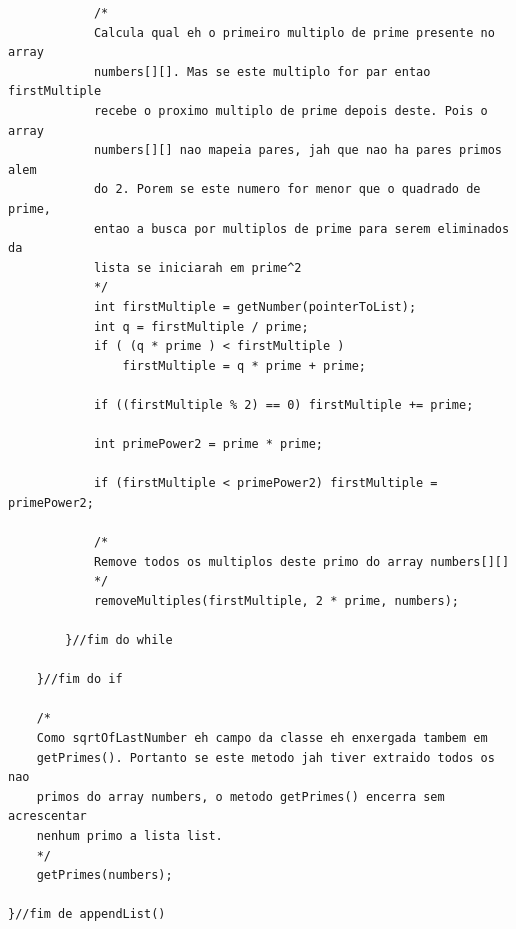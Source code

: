 \documentclass[a4paper,12pt,openany]{book}
\begin{document}
\begin{lstlisting}
			/*
			Calcula qual eh o primeiro multiplo de prime presente no array
			numbers[][]. Mas se este multiplo for par entao firstMultiple
			recebe o proximo multiplo de prime depois deste. Pois o array
			numbers[][] nao mapeia pares, jah que nao ha pares primos alem 
			do 2. Porem se este numero for menor que o quadrado de prime,
			entao a busca por multiplos de prime para serem eliminados da 
			lista se iniciarah em prime^2
			*/
			int firstMultiple = getNumber(pointerToList);
			int q = firstMultiple / prime;
			if ( (q * prime ) < firstMultiple )
				firstMultiple = q * prime + prime;
			
			if ((firstMultiple % 2) == 0) firstMultiple += prime;
			
			int primePower2 = prime * prime;
			
			if (firstMultiple < primePower2) firstMultiple = primePower2;
			
			/*
			Remove todos os multiplos deste primo do array numbers[][]
			*/
			removeMultiples(firstMultiple, 2 * prime, numbers);
			
		}//fim do while
		
	}//fim do if
	
	/*
	Como sqrtOfLastNumber eh campo da classe eh enxergada tambem em 
	getPrimes(). Portanto se este metodo jah tiver extraido todos os nao
	primos do array numbers, o metodo getPrimes() encerra sem acrescentar
	nenhum primo a lista list.
	*/
	getPrimes(numbers);

}//fim de appendList()
\end{lstlisting}

\newpage
\end{document}
